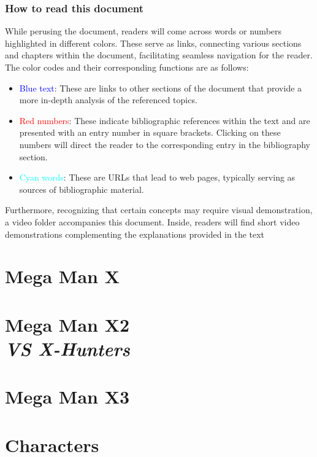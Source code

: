 \documentclass[openany]{report}
\begin{document}
	\section*{How to read this document}
	While perusing the document, readers will come across words or numbers highlighted in different colors. These serve as links, connecting various sections and chapters within the document, facilitating seamless navigation for the reader. The color codes and their corresponding functions are as follows:
	\begin{itemize}
		
	\item \textcolor{blue}{Blue text}: These are links to other sections of the document that provide a more in-depth analysis of the referenced topics.
	
	\item \textcolor{red}{Red numbers}: These indicate bibliographic references within the text and are presented with an entry number in square brackets. Clicking on these numbers will direct the reader to the corresponding entry in the bibliography section.
	
	\item \textcolor{cyan}{Cyan words}: These are URLs that lead to web pages, typically serving as sources of bibliographic material.
	\end{itemize}
	
	Furthermore, recognizing that certain concepts may require visual demonstration, a video folder accompanies this document. Inside, readers will find short video demonstrations complementing the explanations provided in the text
	

\part{Mega Man X}

\label{cha:X1}


\part[Mega Man X2]{Mega Man X2\\[2ex]\Large\itshape{VS X-Hunters}}
\label{cha:X2}

	
\part{Mega Man X3}
\label{cha:X3}

\part{Characters}
\end{document}
